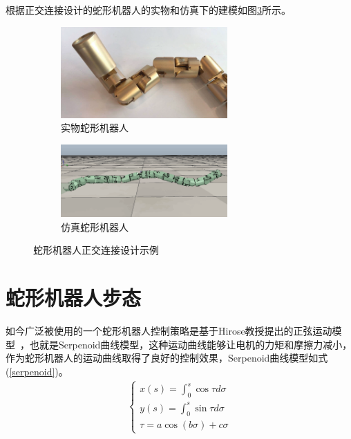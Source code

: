 根据正交连接设计的蛇形机器人的实物和仿真下的建模如图\ref{fig:snakeexample}所示。
\begin{figure}[h!] %
	\begin{subfigure}{0.5\textwidth}
		\centering
		\includegraphics[width=0.7\textwidth,height=0.15\textheight]{figure/chap03/realSnake.eps}
		\caption{实物蛇形机器人}
		\label{fig:realSnake}
	\end{subfigure}
	\begin{subfigure}{0.5\textwidth}
		\centering
		\includegraphics[width=0.7\textwidth,height=0.15\textheight]{figure/chap03/simulateSnake.eps}
		\caption{仿真蛇形机器人}
		\label{fig:simulateSnake}
	\end{subfigure}
	\caption{蛇形机器人正交连接设计示例}
	\label{fig:snakeexample}
\end{figure}


\section{蛇形机器人步态}
如今广泛被使用的一个蛇形机器人控制策略是基于Hirose教授提出的正弦运动模型~\cite{HiroseSine}，也就是Serpenoid曲线模型，这种运动曲线能够让电机的力矩和摩擦力减小，作为蛇形机器人的运动曲线取得了良好的控制效果，Serpenoid曲线模型如式(\ref{serpenoid})。
\begin{eqnarray}\label{serpenoid}
\left\{
\begin{array}{lr}
x(s)=\int_{0}^{s}\cos \tau d\sigma \\
y(s)=\int_{0}^{s}\sin \tau d\sigma \\
\tau =a\cos(b\sigma )+c\sigma
\end{array}
\right.
\end{eqnarray}

